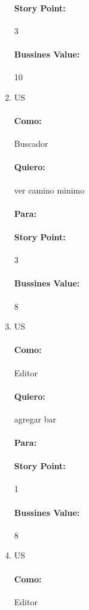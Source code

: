 \documentclass[10pt,a4paper]{article}
\begin{document}
\begin{enumerate}
\paragraph{Story Point:} 3
\paragraph{Bussines Value:} 10

 \item US
 
 
\paragraph{Como:} Buscador
\paragraph{Quiero:} ver camino minimo
\paragraph{Para:}
\paragraph{Story Point:} 3
\paragraph{Bussines Value:} 8 

 \item US
\paragraph{Como:} Editor
\paragraph{Quiero:} agregar bar
\paragraph{Para:}
\paragraph{Story Point:} 1
\paragraph{Bussines Value:} 8


 \item US
\paragraph{Como:} Editor

\end{enumerate}
\end{document}
